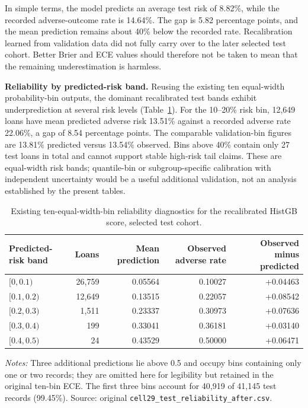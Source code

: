 \documentclass[10pt]{article}
\begin{document}
In simple terms, the model predicts an average test risk of 8.82\%, while the recorded adverse-outcome rate is 14.64\%. The gap is 5.82 percentage points, and the mean prediction remains about 40\% below the recorded rate. Recalibration learned from validation data did not fully carry over to the later selected test cohort. Better Brier and ECE values should therefore not be taken to mean that the remaining underestimation is harmless.

\noindent\textbf{Reliability by predicted-risk band.} Reusing the existing ten equal-width probability-bin outputs, the dominant recalibrated test bands exhibit underprediction at several risk levels (Table~\ref{tab:r2_reliability_bins}). For the 10--20\% risk bin, 12,649 loans have mean predicted adverse risk 13.51\% against a recorded adverse rate 22.06\%, a gap of 8.54 percentage points. The comparable validation-bin figures are 13.81\% predicted versus 13.54\% observed. Bins above 40\% contain only 27 test loans in total and cannot support stable high-risk tail claims. These are equal-width risk bands; quantile-bin or subgroup-specific calibration with independent uncertainty would be a useful additional validation, not an analysis established by the present tables.

\begin{table}[!ht]
\centering
\caption{Existing ten-equal-width-bin reliability diagnostics for the recalibrated HistGB score, selected test cohort.}
\label{tab:r2_reliability_bins}
\begin{tabular}{lrrrr}
\toprule
Predicted-risk band & Loans & Mean prediction & Observed adverse rate & Observed minus predicted \\
\midrule
$[0,0.1)$ & 26,759 & 0.05564 & 0.10027 & +0.04463 \\
$[0.1,0.2)$ & 12,649 & 0.13515 & 0.22057 & +0.08542 \\
$[0.2,0.3)$ & 1,511 & 0.23337 & 0.30973 & +0.07636 \\
$[0.3,0.4)$ & 199 & 0.33041 & 0.36181 & +0.03140 \\
$[0.4,0.5)$ & 24 & 0.43529 & 0.50000 & +0.06471 \\
\bottomrule
\end{tabular}
\par\vspace{2pt}
{\footnotesize \textit{Notes:} Three additional predictions lie above 0.5 and occupy bins containing only one or two records; they are omitted here for legibility but retained in the original ten-bin ECE. The first three bins account for 40,919 of 41,145 test records (99.45\%). Source: original \texttt{cell29\_test\_reliability\_after.csv}.}
\end{table}
\end{document}
